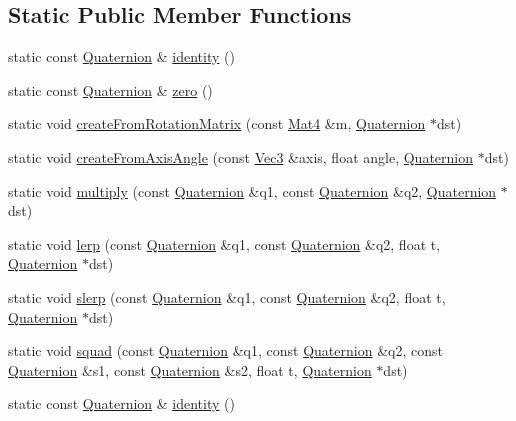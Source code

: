 \subsection*{Static Public Member Functions}
\begin{DoxyCompactItemize}
\item 
static const \hyperlink{classQuaternion}{Quaternion} \& \hyperlink{classQuaternion_a2094c622fd0efd4d47de5b840cfbbd2a}{identity} ()
\item 
static const \hyperlink{classQuaternion}{Quaternion} \& \hyperlink{classQuaternion_a4e1623a2a43917b71d48953a1b712366}{zero} ()
\item 
static void \hyperlink{classQuaternion_aa2b36fa85ccf43b7aa801d86109b35c8}{create\+From\+Rotation\+Matrix} (const \hyperlink{classMat4}{Mat4} \&m, \hyperlink{classQuaternion}{Quaternion} $\ast$dst)
\item 
static void \hyperlink{classQuaternion_acb56cdb2e0e693ce79826e3d42892860}{create\+From\+Axis\+Angle} (const \hyperlink{classVec3}{Vec3} \&axis, float angle, \hyperlink{classQuaternion}{Quaternion} $\ast$dst)
\item 
static void \hyperlink{classQuaternion_a0c8580557a603a3822b3bf5b60c75884}{multiply} (const \hyperlink{classQuaternion}{Quaternion} \&q1, const \hyperlink{classQuaternion}{Quaternion} \&q2, \hyperlink{classQuaternion}{Quaternion} $\ast$dst)
\item 
static void \hyperlink{classQuaternion_a368f2a3510b1c20dfe0b9ab3fc10a1e7}{lerp} (const \hyperlink{classQuaternion}{Quaternion} \&q1, const \hyperlink{classQuaternion}{Quaternion} \&q2, float t, \hyperlink{classQuaternion}{Quaternion} $\ast$dst)
\item 
static void \hyperlink{classQuaternion_a1f1bac1c3d55207b43cf6cc926c453af}{slerp} (const \hyperlink{classQuaternion}{Quaternion} \&q1, const \hyperlink{classQuaternion}{Quaternion} \&q2, float t, \hyperlink{classQuaternion}{Quaternion} $\ast$dst)
\item 
static void \hyperlink{classQuaternion_ad5f6786aac5fa54f2665a651f9aa1938}{squad} (const \hyperlink{classQuaternion}{Quaternion} \&q1, const \hyperlink{classQuaternion}{Quaternion} \&q2, const \hyperlink{classQuaternion}{Quaternion} \&s1, const \hyperlink{classQuaternion}{Quaternion} \&s2, float t, \hyperlink{classQuaternion}{Quaternion} $\ast$dst)
\item 
static const \hyperlink{classQuaternion}{Quaternion} \& \hyperlink{classQuaternion_ab201296bf4af9977fb3357d31b5f5378}{identity} ()
\item 

\end{DoxyCompactItemize}
